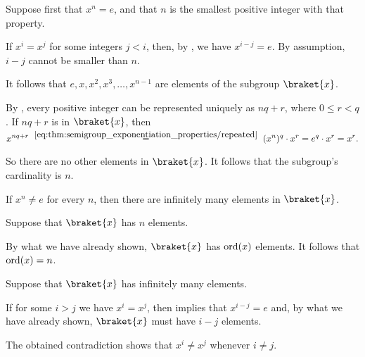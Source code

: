 \begin{defproof}

   Suppose first that \( x^n = e \), and that \( n \) is the smallest positive integer with that property.

  If \( x^i = x^j \) for some integers \( j < i \), then, by , we have \( x^{i - j} = e \). By assumption, \( i - j \) cannot be smaller than \( n \).

  It follows that \( e, x, x^2, x^3, \ldots, x^{n-1} \) are elements of the subgroup \( \braket{ x } \).

  By , every positive integer can be represented uniquely as \( nq + r \), where \( 0 \leq r < q \). If \( nq + r \) is in \( \braket{ x } \), then
  \begin{equation*}
    x^{nq+r}
    \reloset {\eqref{eq:thm:semigroup_exponentiation_properties/repeated}} =
    (x^n)^q \cdot x^r
    =
    e^q \cdot x^r = x^r.
  \end{equation*}

  So there are no other elements in \( \braket{ x } \). It follows that the subgroup's cardinality is \( n \).

   If \( x^n \neq e \) for every \( n \), then there are infinitely many elements in \( \braket{ x } \).


   Suppose that \( \braket{ x } \) has \( n \) elements.

  By what we have already shown, \( \braket{ x } \) has \( \operatorname{ord}(x) \) elements. It follows that \( \operatorname{ord}(x) = n \).

   Suppose that \( \braket{ x } \) has infinitely many elements.

  If for some \( i > j \) we have \( x^i = x^j \), then  implies that \( x^{i-j} = e \) and, by what we have already shown, \( \braket{ x } \) must have \( i - j \) elements.

  The obtained contradiction shows that \( x^i \neq x^j \) whenever \( i \neq j \).
\end{defproof}

